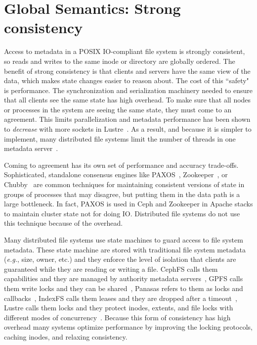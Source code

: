 \section{Global Semantics: Strong consistency}

Access to metadata in a POSIX IO-compliant file system is strongly consistent,
so reads and writes to the same inode or directory are globally ordered.  The
benefit of strong consistency is that clients and servers have the same view of
the data, which makes state changes easier to reason about.  The cost of this
``safety" is performance.  The synchronization and serialization machinery
needed to ensure that all clients see the same state has high overhead.  To
make sure that all nodes or processes in the system are seeing the same state,
they must come to an agreement.  This limits parallelization and metadata
performance has been shown to {\it decrease} with more sockets in
Lustre~\cite{konstantinos:pdsw2014-lustre-metadata}. As a result, and because
it is simpler to implement, many distributed file systems limit the number of
threads in one metadata server~\cite{weil:osdi2006-ceph,
alam:pdsw2011-metadata-scaling, ren:sc2014-indexfs}. 

Coming to agreement has its own set of performance and accuracy trade-offs.
Sophisticated, standalone consensus engines like
PAXOS~\cite{lamport_parttime_1998}, Zookeeper~\cite{hunt_zookeeper_2010}, or
Chubby~\cite{burrows_chubby_2006} are common techniques for maintaining
consistent versions of state in groups of processes that may disagree, but
putting them in the data path is a large bottleneck. In fact, PAXOS is used in
Ceph and Zookeeper in Apache stacks to maintain cluster state not for doing IO.
Distributed file systems do not use this technique because of the overhead.

Many distributed file systems use state machines to guard access to file system
metadata.  These state machine are stored with traditional file system metadata
({\it e.g.}, size, owner, etc.) and they enforce the level of isolation that
clients are guaranteed while they are reading or writing a file. CephFS calls
them capabilities and they are managed by authority metadata servers~\cite{},
GPFS calls them write locks and they can be shared~\cite{}, Panasas refers to
them as locks and callbacks~\cite{}, IndexFS calls them leases and they are
dropped after a timeout~\cite{}, Lustre calls them locks and they protect
inodes, extents, and file locks with different modes of
concurrency~\cite{wang:tech09-lustre}.  Because this form of consistency has
high overhead many systems optimize performance by improving the locking
protocols, caching inodes, and relaxing consistency.

